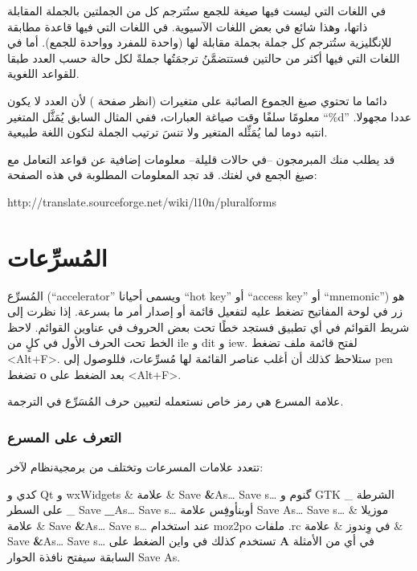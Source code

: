 في اللغات التي ليست فيها صيغة للجمع ستُترجم كل من الجملتين بالجملة
المقابلة ذاتها، وهذا شائع في بعض اللغات الآسيوية. في اللغات التي فيها
قاعدة مطابقة للإنگليزية ستُترجم كل جملة بجملة مقابلة لها (واحدة للمفرد
وواحدة للجمع). أما في اللغات التي فيها أكثر من حالتين فستتضمَّنُ
ترجمَتُها جملةً لكل حالة حسب العدد طبقا للقواعد اللغوية.

دائما ما تحتوي صيغ الجموع الصائبة على متغيرات (انظر صفحة
\at[ref:33556809]) لأن العدد لا يكون معلومًا سلفًا وقت صياغة
العبارات، ففي المثال السابق يُمَثَّل المتغير ‪“\%d”‬ عددا مجهولا. انتبه
دوما لما يُمَثِّله المتغير ولا تنسَ ترتيب الجملة لتكون اللغة طبيعية.

قد يطلب منك المبرمجون –في حالات قليلة– معلومات إضافية عن قواعد التعامل
مع صيغ الجمع في لغتك. قد تجد المعلومات المطلوبة في هذه الصفحة:

http://translate.sourceforge.net/wiki/l10n/pluralforms

\section[ref:34484726]{المُسرِّعات}
المُسرِّع (“accelerator” ويسمى
أحيانا “hot key” أو “access key” أو “mnemonic”) هو زر في لوحة المفاتيح
تضغط عليه لتفعيل قائمة أو إصدار أمر ما بسرعة. إذا نظرت إلى شريط القوائم
في أي تطبيق فستجد خطًا تحت بعض الحروف في عناوين القوائم. لاحظ الخط تحت
الحرف الأول في كلٍ من ile و dit و
iew. لفتح قائمة ملف تضغط <Alt+F>. ستلاحظ كذلك أن أغلب عناصر
القائمة لها مُسرِّعات، فللوصول إلى pen تضغط {\bf o} بعد
الضغط على <Alt+F>.

علامة المسرع هي رمز خاص نستعمله لتعيين حرف المُسَرِّع في الترجمة.

\subsubsection{التعرف على المسرع}
تتعدد علامات المسرعات وتختلف من برمجية نظام لآخر:

\starttable[|l|l|l|l|l|l|]
\HL
\NC {} \NC {} \NC
{} \NC {} \NC
{} \NC {}\NC\AR
\HL
\NC كدي و Qt و wxWidgets \NC \&  \NC علامة \& \NC Save {\bf \&}As…  \NC
Save s… \NC \NC\AR
\HL
\NC گنوم و GTK \NC \_  \NC الشرطة على السطر \_ \NC Save {\bf \_}As…  \NC
Save s… \NC \NC\AR
\HL
\NC أوبن​أوفِس \NC {}   \NC علامة   \NC Save {\bf
{} }As…  \NC Save s… \NC \NC\AR
\HL
\NC موزيلا \NC \&  \NC علامة \& \NC Save {\bf \&}As…  \NC Save
s… \NC عند استخدام moz2po \NC\AR
\HL
\NC ملفات .rc في وِندوز  \NC \&  \NC علامة \& \NC Save {\bf \&}As…  \NC
Save s… \NC تستخدم كذلك في واين\NC\AR
\HL
\stoptable
الضغط على {\bf A} في أي من الأمثلة السابقة سيفتح نافذة الحوار Save As.

